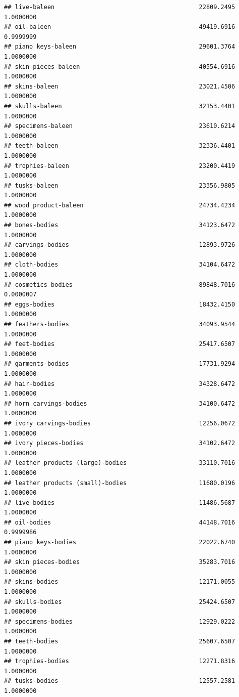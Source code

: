 \documentclass[
  12pt,
]{article}
\begin{document}
\begin{verbatim}
## live-baleen                                        22809.2495 1.0000000
## oil-baleen                                         49419.6916 0.9999999
## piano keys-baleen                                  29601.3764 1.0000000
## skin pieces-baleen                                 40554.6916 1.0000000
## skins-baleen                                       23021.4506 1.0000000
## skulls-baleen                                      32153.4401 1.0000000
## specimens-baleen                                   23610.6214 1.0000000
## teeth-baleen                                       32336.4401 1.0000000
## trophies-baleen                                    23200.4419 1.0000000
## tusks-baleen                                       23356.9805 1.0000000
## wood product-baleen                                24734.4234 1.0000000
## bones-bodies                                       34123.6472 1.0000000
## carvings-bodies                                    12893.9726 1.0000000
## cloth-bodies                                       34104.6472 1.0000000
## cosmetics-bodies                                   89848.7016 0.0000007
## eggs-bodies                                        18432.4150 1.0000000
## feathers-bodies                                    34093.9544 1.0000000
## feet-bodies                                        25417.6507 1.0000000
## garments-bodies                                    17731.9294 1.0000000
## hair-bodies                                        34328.6472 1.0000000
## horn carvings-bodies                               34100.6472 1.0000000
## ivory carvings-bodies                              12256.0672 1.0000000
## ivory pieces-bodies                                34102.6472 1.0000000
## leather products (large)-bodies                    33110.7016 1.0000000
## leather products (small)-bodies                    11680.0196 1.0000000
## live-bodies                                        11486.5687 1.0000000
## oil-bodies                                         44148.7016 0.9999986
## piano keys-bodies                                  22022.6740 1.0000000
## skin pieces-bodies                                 35283.7016 1.0000000
## skins-bodies                                       12171.0055 1.0000000
## skulls-bodies                                      25424.6507 1.0000000
## specimens-bodies                                   12929.0222 1.0000000
## teeth-bodies                                       25607.6507 1.0000000
## trophies-bodies                                    12271.8316 1.0000000
## tusks-bodies                                       12557.2581 1.0000000

\end{verbatim}
\end{document}

